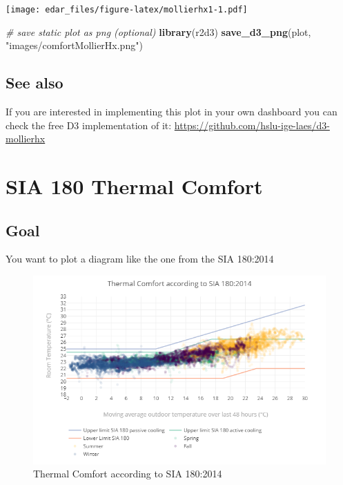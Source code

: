 \documentclass[
  a4paperpaper,
]{book}
\newenvironment{Shaded}{\begin{snugshade}}{\end{snugshade}}
\newcommand{\CommentTok}[1]{\textcolor[rgb]{0.56,0.35,0.01}{\textit{#1}}}
\newcommand{\KeywordTok}[1]{\textcolor[rgb]{0.13,0.29,0.53}{\textbf{#1}}}
\newcommand{\NormalTok}[1]{#1}
\newcommand{\StringTok}[1]{\textcolor[rgb]{0.31,0.60,0.02}{#1}}
\let\oldShaded\Shaded
\let\endoldShaded\endShaded
\renewenvironment{Shaded}{\footnotesize\oldShaded}{\endoldShaded}
\begin{document}
\texttt{[image: edar\_files/figure-latex/mollierhx1-1.pdf]}

\begin{Shaded}
\begin{Highlighting}[]
\CommentTok{# save static plot as png (optional)}
\KeywordTok{library}\NormalTok{(r2d3)}
\KeywordTok{save_d3_png}\NormalTok{(plot, }\StringTok{"images/comfortMollierHx.png"}\NormalTok{)}
\end{Highlighting}
\end{Shaded}

\hypertarget{see-also}{%
\subsection{See also}\label{see-also}}

If you are interested in implementing this plot in your own dashboard you can check the free D3 implementation of it:
\url{https://github.com/hslu-ige-laes/d3-mollierhx}

\newpage

\hypertarget{sia-180-thermal-comfort}{%
\section{SIA 180 Thermal Comfort}\label{sia-180-thermal-comfort}}

\hypertarget{goal-13}{%
\subsection{Goal}\label{goal-13}}

You want to plot a diagram like the one from the SIA 180:2014

\begin{figure}
\includegraphics[width=0.7\linewidth]{images/comfortSia180ThermCmf} \caption{Thermal Comfort according to SIA 180:2014}\label{fig:unnamed-chunk-23}
\end{figure}
\end{document}
